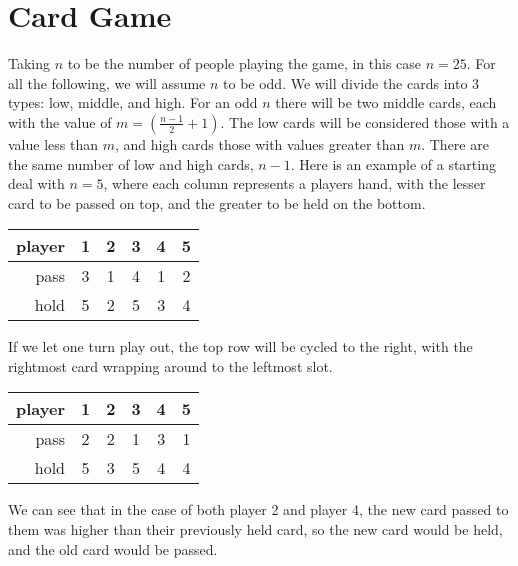 \documentclass[12pt]{article}
\begin{document}
\newpage
\section*{Card Game}
Taking $n$ to be the number of people playing the game, in this case $n=25$. For all the following, we will assume $n$ to be odd. We will divide the cards into 3 types: low, middle, and high. For an odd $n$ there will be two middle cards, each with the value of $m = (\frac{n-1}{2} +1)$. The low cards will be considered those with a value less than $m$, and high cards those with values greater than $m$. There are the same number of low and high cards, $n-1$. Here is an example of a starting deal with $n=5$, where each column represents a players hand, with the lesser card to be passed on top, and the greater to be held on the bottom.

\begin{center}
    \begin{tabular}{|r|c|c|c|c|c|}
        \hline
        \rowcolor[RGB]{220, 220, 220}
        player & 1 & 2 & 3 & 4 & 5\\
        \hline
        pass & 3 & 1 & 4 & 1 & 2\\
        \hline
        hold & 5 & 2 & 5 & 3 & 4\\
        \hline
    \end{tabular}
\end{center}

If we let one turn play out, the top row will be cycled to the right, with the rightmost card wrapping around to the leftmost slot.

\begin{center}
    \begin{tabular}{|r|c|c|c|c|c|}
        \hline
        \rowcolor[RGB]{220, 220, 220}
        player & 1 & 2 & 3 & 4 & 5\\
        \hline
        pass & 2 & 2 & 1 & 3 & 1\\
        \hline
        hold & 5 & 3 & 5 & 4 & 4\\
        \hline
    \end{tabular}
\end{center}

We can see that in the case of both player 2 and player 4, the new card passed to them was higher than their previously held card, so the new card would be held, and the old card would be passed. 
\end{document}
